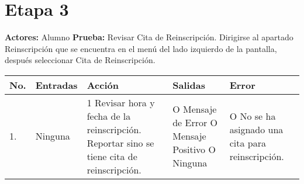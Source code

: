\section*{Etapa 3}
\textbf{Actores:} Alumno\newline
\textbf{Prueba:} Revisar Cita de Reinscripción.
Dirigirse al apartado Reinscripción que se encuentra en el menú del lado izquierdo de la pantalla, después seleccionar Cita de Reinscripción.
\begin{longtable}{|p{0.7cm}|p{3cm}|p{6cm}|p{2.3cm}|p{3cm}|}
    \hline	
	\textbf{No.}
	&
	\textbf{Entradas}	
	&
	\textbf{Acción}
	&
	\textbf{Salidas}
	&
	\textbf{Error}
	\\
	\hline
	1.
	&
	Ninguna	
	&
	1 Revisar hora y fecha de la reinscripción.\newline
	2 Reportar sino se tiene cita de reinscripción.
	&
	O Mensaje de Error\newline
 	O Mensaje Positivo\newline
 	O Ninguna
 	&
 	O No se ha asignado una cita para reinscripción.\\
 	\hline
\end{longtable}
